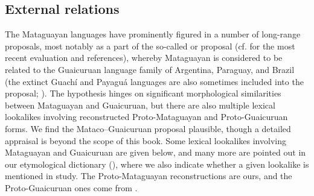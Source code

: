 \subsection{External relations} \label{intro-external}

The Mataguayan languages have prominently figured in a number of long-range proposals, most notably as a part of the so-called  or  proposal (cf.  for the most recent evaluation and references), whereby Mataguayan is considered to be related to the Guaicuruan language family of Argentina, Paraguay, and Brazil (the extinct Guachí and Payaguá languages are also sometimes included into the proposal; ). The hypothesis hinges on significant morphological similarities between Mataguayan and Guaicuruan, but there are also multiple lexical lookalikes involving reconstructed Proto-Mataguayan and Proto-Guaicuruan forms. We find the Mataco–Guaicuruan proposal plausible, though a detailed appraisal is beyond the scope of this book. Some lexical lookalikes involving Mataguayan and Guaicuruan are given below, and many more are pointed out in our etymological dictionary (), where we also indicate whether a given lookalike is mentioned in  study. The Proto-Mataguayan reconstructions are ours, and the Proto-Guaicuruan ones come from \citet{PVB13b}.

